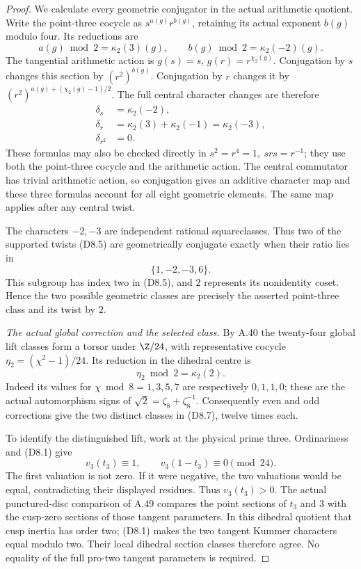 \begin{proof}
We calculate every geometric conjugator in the actual
arithmetic quotient.  Write the point-three cocycle as
\(s^{a(g)}r^{b(g)}\), retaining its actual exponent
\(b(g)\) modulo four.  Its reductions are
\[
 a(g)\bmod2=\kappa_2(3)(g),\qquad
 b(g)\bmod2=\kappa_2(-2)(g).
\]
The tangential arithmetic action is
\(g(s)=s\), \(g(r)=r^{\chi_2(g)}\).
Conjugation by \(s\) changes this section by
\((r^2)^{b(g)}\).  Conjugation by \(r\) changes it by
\((r^2)^{a(g)+(\chi_2(g)-1)/2}\).
The full central character changes are therefore
\[
 \begin{aligned}
       \delta_s&=\kappa_2(-2),\\
       \delta_r&=\kappa_2(3)+\kappa_2(-1)
                                      =\kappa_2(-3),\\
       \delta_{r^2}&=0.
 \end{aligned}
\tag{D8.6}
\]
These formulas may also be checked directly in
\(s^2=r^4=1,\ srs=r^{-1}\); they use both the
point-three cocycle and the arithmetic action.
The central commutator has trivial arithmetic action,
so conjugation gives an additive character map and
these three formulas account for all eight geometric
elements.  The same map applies after any central twist.

The characters \(-2,-3\) are independent rational
squareclasses.  Thus two of the supported twists
(D8.5) are geometrically conjugate exactly when their
ratio lies in
\[
                           \{1,-2,-3,6\}.
\tag{D8.7}
\]
This subgroup has index two in (D8.5), and \(2\)
represents its nonidentity coset.  Hence the two
possible geometric classes are precisely the asserted
point-three class and its twist by \(2\).

\emph{The actual global correction and the selected class.}
By A.40 the twenty-four global lift classes form a
torsor under \(\Z/24\), with representative cocycle
\(\eta_2=(\chi^2-1)/24\).  Its reduction in the
dihedral centre is
\[
             \eta_2\bmod2=\kappa_2(2).
\tag{D8.8}
\]
Indeed its values for \(\chi\bmod8=1,3,5,7\) are
respectively \(0,1,1,0\); these are the actual
automorphism signs of
\(\sqrt2=\zeta_8+\zeta_8^{-1}\).
Consequently even and odd corrections give the two
distinct classes in (D8.7), twelve times each.

To identify the distinguished lift, work at the
physical prime three.  Ordinariness and (D8.1) give
\[
            v_3(t_3)\equiv1,\qquad
            v_3(1-t_3)\equiv0\pmod {24}.
\tag{D8.9}
\]
The first valuation is not zero.  If it were negative,
the two valuations would be equal, contradicting
their displayed residues.  Thus \(v_3(t_3)>0\).
The actual punctured-disc comparison of A.49 compares
the point sections of \(t_3\) and \(3\) with the
cusp-zero sections of those tangent parameters.
In this dihedral quotient that cusp inertia has
order two; (D8.1) makes the two tangent Kummer
characters equal modulo two.  Their local dihedral
section classes therefore agree.  No equality of
the full pro-two tangent parameters is required.


\end{proof}

